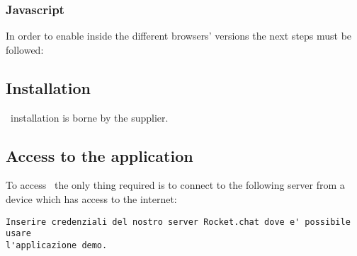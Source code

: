 \subsubsection{Javascript}
In order to enable  inside the different browsers' versions the next steps must be followed:


\subsection{Installation}
\app\ installation is borne by the supplier.

\subsection{Access to the application}
To access \app\, the only thing required is to connect to the following  server from a device which has access to the internet:
\begin{lstlisting}
Inserire credenziali del nostro server Rocket.chat dove e' possibile usare 
l'applicazione demo.
\end{lstlisting}


\newpage